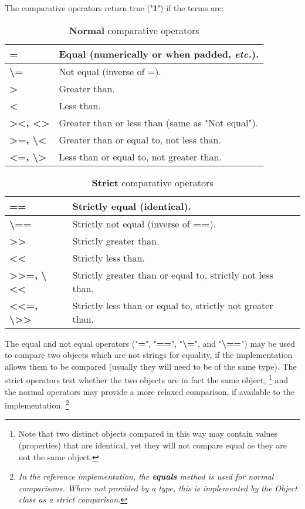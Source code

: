  The comparative operators return true (\textbf{'1'}) if the terms
are:
\begin{table}\caption{\textbf{Normal} comparative  operators}
\begin{tabularx}{\textwidth}{>{\bfseries}lX}
\toprule
=&Equal (numerically or when padded, \emph{etc.}).
\\\midrule
\textbackslash =&Not equal (inverse of =).
\\\midrule
>&Greater than.
\\\midrule
<&Less than.
\\\midrule
><, <>&Greater than or less than (same as "Not equal").
\\\midrule
>=, \textbackslash <&Greater than or equal to, not less than.
\\\midrule
<=, \textbackslash >&Less than or equal to, not greater than.
\\\bottomrule
\end{tabularx}
\end{table}
\begin{table}\caption{\textbf{Strict} comparative  operators}
\begin{tabularx}{\textwidth}{>{\bfseries}lX}
\toprule
==&Strictly equal (identical).
\\\midrule
\textbackslash ==&Strictly not equal (inverse of \textbf{==}).
\\\midrule
>>&Strictly greater than.
\\\midrule
<<&Strictly less than.
\\\midrule
>>=, \textbackslash <<&Strictly greater than or equal to, strictly not
less than.
\\\midrule
<<=, \textbackslash >>&Strictly less than or equal to, strictly not
greater than.
\\\bottomrule
\end{tabularx}
\end{table}
The equal and not equal operators ("\textbf{=}",
"\textbf{==}", "\textbf{\textbackslash =}", and
"\textbf{\textbackslash ==}") may be used to compare two objects which
are not strings for equality, if the implementation allows them to be
compared (usually they will need to be of the same type).  The strict
operators test whether the two objects are in fact the same object,
\footnote{
Note that two distinct objects compared in this way may contain values
(properties) that are identical, yet they will not compare equal as they
are not the same object.
}
and the normal operators may provide a more relaxed comparison, if
available to the implementation.
\footnote{
\emph{In the reference implementation, the \textbf{equals} method is
used for normal comparisons.  Where not provided by a type, this is
implemented by the Object class as a strict comparison.}
}
 
